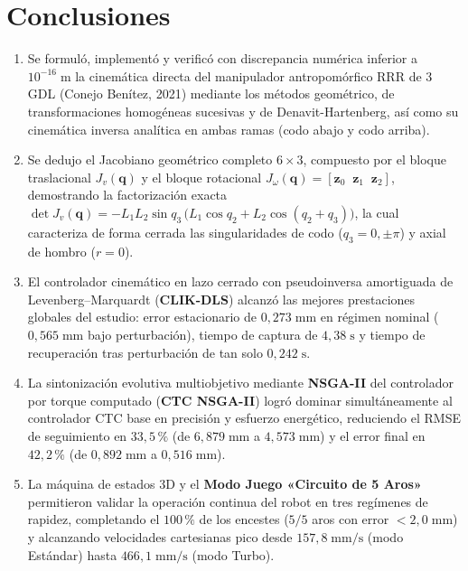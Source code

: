 \documentclass[11pt,a4paper]{article}
\begin{document}
\section{Conclusiones}

\begin{enumerate}[leftmargin=*, topsep=3pt, itemsep=3pt]
\item Se formuló, implementó y verificó con discrepancia numérica inferior a $10^{-16}\;\text{m}$ la cinemática directa del manipulador antropomórfico RRR de 3\,GDL (Conejo Benítez, 2021) mediante los métodos geométrico, de transformaciones homogéneas sucesivas y de Denavit-Hartenberg, así como su cinemática inversa analítica en ambas ramas (codo abajo y codo arriba).

\item Se dedujo el Jacobiano geométrico completo $6\times 3$, compuesto por el bloque traslacional $J_{v}(\bm{q})$ y el bloque rotacional $J_{\omega}(\bm{q})=[\bm{z}_{0}\;\;\bm{z}_{1}\;\;\bm{z}_{2}]$, demostrando la factorización exacta $\det J_{v}(\bm{q})=-L_{1}L_{2}\sin q_{3}\,\bigl(L_{1}\cos q_{2}+L_{2}\cos(q_{2}+q_{3})\bigr)$, la cual caracteriza de forma cerrada las singularidades de codo ($q_{3}=0,\pm\pi$) y axial de hombro ($r=0$).

\item El controlador cinemático en lazo cerrado con pseudoinversa amortiguada de Levenberg--Marquardt (\textbf{CLIK-DLS}) alcanzó las mejores prestaciones globales del estudio: error estacionario de $0{,}273\;\text{mm}$ en régimen nominal ($0{,}565\;\text{mm}$ bajo perturbación), tiempo de captura de $4{,}38\;\text{s}$ y tiempo de recuperación tras perturbación de tan solo $0{,}242\;\text{s}$.

\item La sintonización evolutiva multiobjetivo mediante \textbf{NSGA-II} del controlador por torque computado (\textbf{CTC NSGA-II}) logró dominar simultáneamente al controlador CTC base en precisión y esfuerzo energético, reduciendo el RMSE de seguimiento en $33{,}5\,\%$ (de $6{,}879\;\text{mm}$ a $4{,}573\;\text{mm}$) y el error final en $42{,}2\,\%$ (de $0{,}892\;\text{mm}$ a $0{,}516\;\text{mm}$).

\item La máquina de estados 3D y el \textbf{Modo Juego «Circuito de 5 Aros»} permitieron validar la operación continua del robot en tres regímenes de rapidez, completando el $100\,\%$ de los encestes ($5/5$ aros con error $<2{,}0\;\text{mm}$) y alcanzando velocidades cartesianas pico desde $157{,}8\;\text{mm/s}$ (modo Estándar) hasta $466{,}1\;\text{mm/s}$ (modo Turbo).
\end{enumerate}
\end{document}
